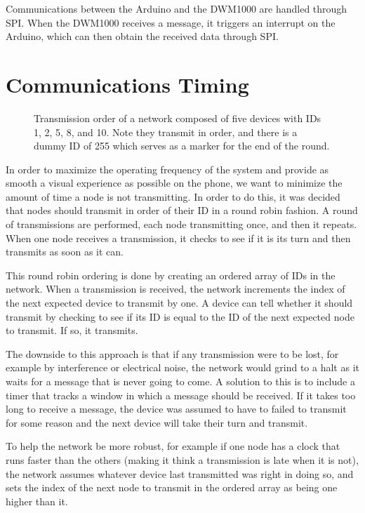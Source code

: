 Communications between the Arduino and the DWM1000 are handled through SPI. When the DWM1000 receives a message, it triggers an interrupt on the Arduino, which can then obtain the received data through SPI.

\section{Communications Timing}

\begin{figure}
	\centering
	
	\decoRule
	\caption{Transmission order of a network composed of five devices with IDs 1, 2, 5, 8, and 10. Note they transmit in order, and there is a dummy ID of 255 which serves as a marker for the end of the round.}
	\label{fig:TransmissionOrder}
\end{figure}

In order to maximize the operating frequency of the system and provide as smooth a visual experience as possible on the phone, we want to minimize the amount of time a node is not transmitting. In order to do this, it was decided that nodes should transmit in order of their ID in a round robin fashion. A round of transmissions are performed, each node transmitting once, and then it repeats. When one node receives a transmission, it checks to see if it is its turn and then transmits as soon as it can.

This round robin ordering is done by creating an ordered array of IDs in the network. When a transmission is received, the network increments the index of the next expected device to transmit by one. A device can tell whether it should transmit by checking to see if its ID is equal to the ID of the next expected node to transmit. If so, it transmits. 

The downside to this approach is that if any transmission were to be lost, for example by interference or electrical noise, the network would grind to a halt as it waits for a message that is never going to come. A solution to this is to include a timer that tracks a window in which a message should be received. If it takes too long to receive a message, the device was assumed to have to failed to transmit for some reason and the next device will take their turn and transmit.

To help the network be more robust, for example if one node has a clock that runs faster than the others (making it think a transmission is late when it is not), the network assumes whatever device last transmitted was right in doing so, and sets the index of the next node to transmit in the ordered array as being one higher than it.

